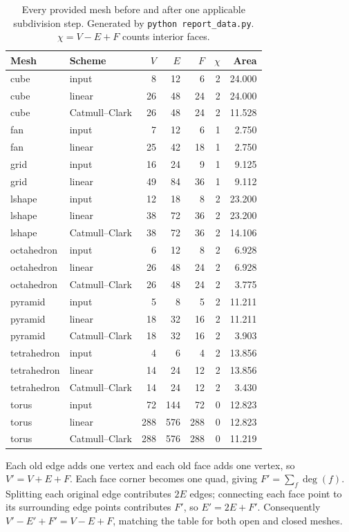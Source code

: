 \documentclass[10pt,a4paper]{article}
\newcommand{\code}[1]{\texttt{#1}}
\begin{document}
\begin{table}[h!]
\centering
\caption{Every provided mesh before and after one applicable subdivision step.
  Generated by \code{python report\_data.py}. $\chi=V-E+F$ counts interior faces.}
\vspace{3pt}
\small
\begin{tabular}{llrrrrr}
\toprule
Mesh & Scheme & $V$ & $E$ & $F$ & $\chi$ & Area \\
\midrule
cube & input & 8 & 12 & 6 & 2 & 24.000 \\
cube & linear & 26 & 48 & 24 & 2 & 24.000 \\
cube & Catmull--Clark & 26 & 48 & 24 & 2 & 11.528 \\
fan & input & 7 & 12 & 6 & 1 & 2.750 \\
fan & linear & 25 & 42 & 18 & 1 & 2.750 \\
grid & input & 16 & 24 & 9 & 1 & 9.125 \\
grid & linear & 49 & 84 & 36 & 1 & 9.112 \\
lshape & input & 12 & 18 & 8 & 2 & 23.200 \\
lshape & linear & 38 & 72 & 36 & 2 & 23.200 \\
lshape & Catmull--Clark & 38 & 72 & 36 & 2 & 14.106 \\
octahedron & input & 6 & 12 & 8 & 2 & 6.928 \\
octahedron & linear & 26 & 48 & 24 & 2 & 6.928 \\
octahedron & Catmull--Clark & 26 & 48 & 24 & 2 & 3.775 \\
pyramid & input & 5 & 8 & 5 & 2 & 11.211 \\
pyramid & linear & 18 & 32 & 16 & 2 & 11.211 \\
pyramid & Catmull--Clark & 18 & 32 & 16 & 2 & 3.903 \\
tetrahedron & input & 4 & 6 & 4 & 2 & 13.856 \\
tetrahedron & linear & 14 & 24 & 12 & 2 & 13.856 \\
tetrahedron & Catmull--Clark & 14 & 24 & 12 & 2 & 3.430 \\
torus & input & 72 & 144 & 72 & 0 & 12.823 \\
torus & linear & 288 & 576 & 288 & 0 & 12.823 \\
torus & Catmull--Clark & 288 & 576 & 288 & 0 & 11.219 \\
\bottomrule
\end{tabular}
\end{table}

Each old edge adds one vertex and each old face adds one vertex, so
$V'=V+E+F$. Each face corner becomes one quad, giving
$F'=\sum_f\deg(f)$. Splitting each original edge contributes $2E$ edges;
connecting each face point to its surrounding edge points contributes $F'$,
so $E'=2E+F'$. Consequently $V'-E'+F'=V-E+F$, matching the table for both
open and closed meshes.
\end{document}
